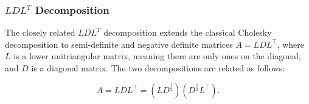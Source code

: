 \subsubsection{$LDL^T$ Decomposition}

The closely related $LDL^T$ decomposition extends the classical Cholesky
decomposition to semi-definite and negative definite matrices $A = L D
L^\top$, where $L$ is a lower unitriangular matrix, meaning there are
only ones on the diagonal, and $D$ is a diagonal matrix. The two
decompositions are related as follows:

\begin{equation}\label{eq:LDL}
  A = LDL^\top = (L D^\frac{1}{2}) (D^\frac{1}{2}  L^\top).
\end{equation}

